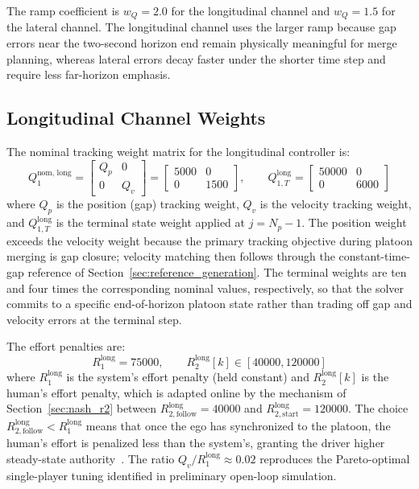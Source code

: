 \documentclass[12pt,a4paper,oneside]{report}
\begin{document}
The ramp coefficient is $w_Q = 2.0$ for the longitudinal channel and $w_Q = 1.5$ for the lateral channel. The longitudinal channel uses the larger ramp because gap errors near the two-second horizon end remain physically meaningful for merge planning, whereas lateral errors decay faster under the shorter time step and require less far-horizon emphasis.

\subsection{Longitudinal Channel Weights}
\label{sec:long_weights}

The nominal tracking weight matrix for the longitudinal controller is:
\begin{equation}
Q_1^{\text{nom, long}} = \begin{bmatrix} Q_p & 0 \\ 0 & Q_v \end{bmatrix} = \begin{bmatrix} 5000 & 0 \\ 0 & 1500 \end{bmatrix}, \qquad
Q_{1,T}^{\text{long}} = \begin{bmatrix} 50000 & 0 \\ 0 & 6000 \end{bmatrix}
\label{eq:Q1_long}
\end{equation}
where $Q_p$ is the position (gap) tracking weight, $Q_v$ is the velocity tracking weight, and $Q_{1,T}^{\text{long}}$ is the terminal state weight applied at $j = N_p - 1$. The position weight exceeds the velocity weight because the primary tracking objective during platoon merging is gap closure; velocity matching then follows through the constant-time-gap reference of Section~\ref{sec:reference_generation}. The terminal weights are ten and four times the corresponding nominal values, respectively, so that the solver commits to a specific end-of-horizon platoon state rather than trading off gap and velocity errors at the terminal step.

The effort penalties are:
\begin{equation}
R_1^{\text{long}} = 75000, \qquad R_2^{\text{long}}[k] \in [40000, 120000]
\label{eq:R_long}
\end{equation}
where $R_1^{\text{long}}$ is the system's effort penalty (held constant) and $R_2^{\text{long}}[k]$ is the human's effort penalty, which is adapted online by the mechanism of Section~\ref{sec:nash_r2} between $R_{2,\text{follow}}^{\text{long}} = 40000$ and $R_{2,\text{start}}^{\text{long}} = 120000$. The choice $R_{2,\text{follow}}^{\text{long}} < R_1^{\text{long}}$ means that once the ego has synchronized to the platoon, the human's effort is penalized less than the system's, granting the driver higher steady-state authority~\cite{naTwoNashequilibriumbasedSteering2022}. The ratio $Q_v / R_1^{\text{long}} \approx 0.02$ reproduces the Pareto-optimal single-player tuning identified in preliminary open-loop simulation.
\end{document}
